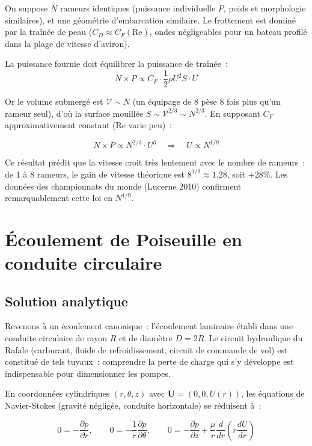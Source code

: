 \documentclass[11pt,a4paper]{report}
\newcommand{\pd}[2]{\dfrac{\partial #1}{\partial #2}}
\begin{document}
On suppose $N$ rameurs identiques (puissance individuelle $P$, poids et
morphologie similaires), et une géométrie d'embarcation similaire. Le frottement
est dominé par la traînée de peau ($C_D \approx C_F(\mathrm{Re})$, ondes négligeables
pour un bateau profilé dans la plage de vitesse d'aviron).

La puissance fournie doit équilibrer la puissance de traînée~:
\[
    N \times P \propto C_F \cdot \frac{1}{2}\rho U^2 S \cdot U
\]

Or le volume submergé est $\mathcal{V} \sim N$ (un équipage de 8 pèse 8 fois plus
qu'un rameur seul), d'où la surface mouillée $S \sim \mathcal{V}^{2/3} \sim N^{2/3}$.
En supposant $C_F$ approximativement constant (Re varie peu)~:

\[
    N \times P \propto N^{2/3} \cdot U^3
    \quad\Longrightarrow\quad
    U \propto N^{1/9}
\]

Ce résultat prédit que la vitesse croit très lentement avec le nombre de
rameurs~: de 1 à 8 rameurs, le gain de vitesse théorique est
$8^{1/9} \approx 1.28$, soit $+28\%$. Les données des championnats du monde
(Lucerne 2010) confirment remarquablement cette loi en $N^{1/9}$.

\section{Écoulement de Poiseuille en conduite circulaire}

\subsection{Solution analytique}

Revenons à un écoulement canonique~: l'écoulement laminaire établi dans une
conduite circulaire de rayon $R$ et de diamètre $D=2R$. Le circuit hydraulique
du Rafale (carburant, fluide de refroidissement, circuit de commande de vol)
est constitué de tels tuyaux~: comprendre la perte de charge qui s'y développe
est indispensable pour dimensionner les pompes.

En coordonnées cylindriques $(r, \theta, z)$ avec $\bm{U}=(0,0,U(r))$,
les équations de Navier-Stokes (gravité négligée, conduite horizontale)
se réduisent à~:

\[
    0 = -\pd{p}{r}, \qquad 0 = -\frac{1}{r}\pd{p}{\theta}, \qquad
    0 = -\pd{p}{z} + \frac{\mu}{r}\frac{d}{dr}\!\left(r\frac{dU}{dr}\right)
\]
\end{document}
